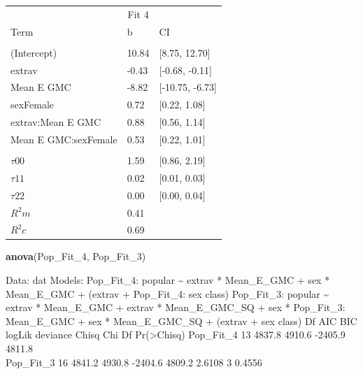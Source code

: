 \documentclass[]{article}
\newenvironment{Shaded}{\begin{snugshade}}{\end{snugshade}}
\newcommand{\KeywordTok}[1]{\textcolor[rgb]{0.13,0.29,0.53}{\textbf{#1}}}
\newcommand{\DecValTok}[1]{\textcolor[rgb]{0.00,0.00,0.81}{#1}}
\newcommand{\NormalTok}[1]{#1}
\begin{document}
\begin{tabular}{lll}
\toprule
\multicolumn{1}{c}{ } & \multicolumn{1}{c}{Fit 4} \\
\cmidrule(l{2pt}r{2pt}){2-2}
Term & b & CI\\
\midrule
\addlinespace[0.3em]
\multicolumn{3}{l}{\textbf{Fixed}}\\
\hspace{1em}(Intercept) & 10.84 & [8.75, 12.70]\\
\hspace{1em}extrav & -0.43 & [-0.68, -0.11]\\
\hspace{1em}Mean E GMC & -8.82 & [-10.75, -6.73]\\
\hspace{1em}sexFemale & 0.72 & [0.22, 1.08]\\
\hspace{1em}extrav:Mean E GMC & 0.88 & [0.56, 1.14]\\
\hspace{1em}Mean E GMC:sexFemale & 0.53 & [0.22, 1.01]\\
\addlinespace[0.3em]
\multicolumn{3}{l}{\textbf{Random}}\\
\hspace{1em}$\tau {00}$ & 1.59 & [0.86, 2.19]\\
\hspace{1em}$\tau {11}$ & 0.02 & [0.01, 0.03]\\
\hspace{1em}$\tau {22}$ & 0.00 & [0.00, 0.04]\\
$R^2 m$ & 0.41 & \\
$R^2 c$ & 0.69 & \\
\bottomrule
\end{tabular}

\begin{Shaded}
\begin{Highlighting}[]
\KeywordTok{anova}\NormalTok{(Pop_Fit_}\DecValTok{4}\NormalTok{, Pop_Fit_}\DecValTok{3}\NormalTok{)}
\end{Highlighting}
\end{Shaded}

Data: dat Models: Pop\_Fit\_4: popular \textasciitilde{} extrav *
Mean\_E\_GMC + sex * Mean\_E\_GMC + (extrav + Pop\_Fit\_4: sex
\textbar{} class) Pop\_Fit\_3: popular \textasciitilde{} extrav *
Mean\_E\_GMC + extrav * Mean\_E\_GMC\_SQ + sex * Pop\_Fit\_3:
Mean\_E\_GMC + sex * Mean\_E\_GMC\_SQ + (extrav + sex \textbar{} class)
Df AIC BIC logLik deviance Chisq Chi Df Pr(\textgreater{}Chisq)
Pop\_Fit\_4 13 4837.8 4910.6 -2405.9 4811.8\\
Pop\_Fit\_3 16 4841.2 4930.8 -2404.6 4809.2 2.6108 3 0.4556
\end{document}
